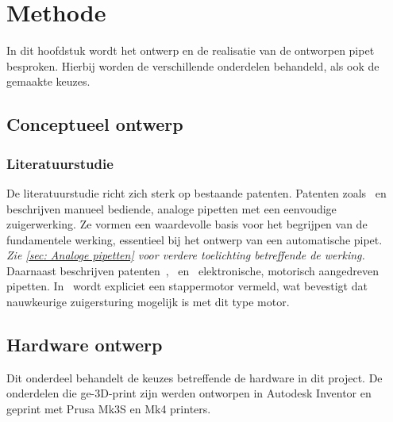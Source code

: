 \chapter{Methode}
In dit hoofdstuk wordt het ontwerp en de realisatie van de ontworpen pipet besproken. Hierbij worden de verschillende onderdelen behandeld, als ook de gemaakte keuzes.

\section{Conceptueel ontwerp}
\subsection{Literatuurstudie}
De literatuurstudie richt zich sterk op bestaande patenten. Patenten zoals\ \cite{RN16} en\ \cite{RN17} beschrijven manueel bediende, analoge pipetten met een eenvoudige zuigerwerking. Ze vormen een waardevolle basis voor het begrijpen van de fundamentele werking, essentieel bij het ontwerp van een automatische pipet.
\\\textit{Zie \autoref{sec: Analoge pipetten} voor verdere toelichting betreffende de werking.}
\\[12pt]Daarnaast beschrijven patenten\ \cite{RN35},\ \cite{RN36} en\ \cite{RN38} elektronische, motorisch aangedreven pipetten. In\ \cite{RN35} wordt expliciet een stappermotor vermeld, wat bevestigt dat nauwkeurige zuigersturing mogelijk is met dit type motor.

\section{Hardware ontwerp}
Dit onderdeel behandelt de keuzes betreffende de hardware in dit project. De onderdelen die ge-3D-print zijn werden ontworpen in Autodesk Inventor en geprint met Prusa Mk3S en Mk4 printers.

